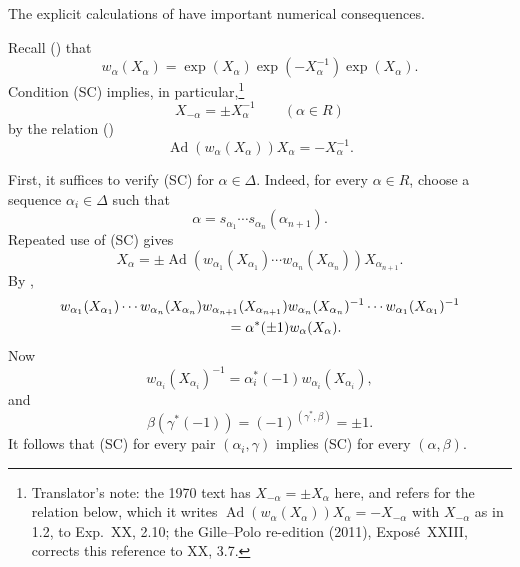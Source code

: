 
The explicit calculations of  have important numerical
consequences.


Recall () that
\[
  w_\alpha(X_\alpha)
    =\exp(X_\alpha)\exp(-X_\alpha^{-1})\exp(X_\alpha).
\]
Condition (SC) implies, in particular,\footnote{Translator's note: the 1970 text has
\(X_{-\alpha}=\pm X_\alpha\) here, and refers for the relation below, which it writes
\(\operatorname{Ad}(w_\alpha(X_\alpha))X_\alpha=-X_{-\alpha}\) with \(X_{-\alpha}\) as in
1.2, to Exp.~XX, 2.10; the Gille--Polo re-edition (2011), Exposé~XXIII, corrects this
reference to XX, 3.7.}
\[
  X_{-\alpha}=\pm X_\alpha^{-1}\qquad(\alpha\in R)
\]
by the relation ()
\[
  \operatorname{Ad}(w_\alpha(X_\alpha))X_\alpha=-X_\alpha^{-1}.
\]


First, it suffices to verify (SC) for \(\alpha\in\Delta\). Indeed,
for every \(\alpha\in R\), choose a sequence
\(\alpha_i\in\Delta\) such that
\[
  \alpha=s_{\alpha_1}\cdots s_{\alpha_n}(\alpha_{n+1}).
\]
Repeated use of (SC) gives
\[
 X_\alpha
  =\pm\operatorname{Ad}\!\left(
    w_{\alpha_1}(X_{\alpha_1})\cdots
    w_{\alpha_n}(X_{\alpha_n})\right)X_{\alpha_{n+1}}.
\]
By ,
\[
\begin{aligned}
 &w_{\alpha_1}(X_{\alpha_1})\cdots w_{\alpha_n}(X_{\alpha_n})
  w_{\alpha_{n+1}}(X_{\alpha_{n+1}})
  w_{\alpha_n}(X_{\alpha_n})^{-1}\cdots
  w_{\alpha_1}(X_{\alpha_1})^{-1}\\
 &\hspace{42mm}=\alpha^*(\pm1)w_\alpha(X_\alpha).
\end{aligned}
\]
Now
\[
 w_{\alpha_i}(X_{\alpha_i})^{-1}
  =\alpha_i^*(-1)w_{\alpha_i}(X_{\alpha_i}),
\]
and
\[
 \beta(\gamma^*(-1))=(-1)^{(\gamma^*,\beta)}=\pm1.
\]
It follows that (SC) for every pair \((\alpha_i,\gamma)\) implies
(SC) for every \((\alpha,\beta)\).

